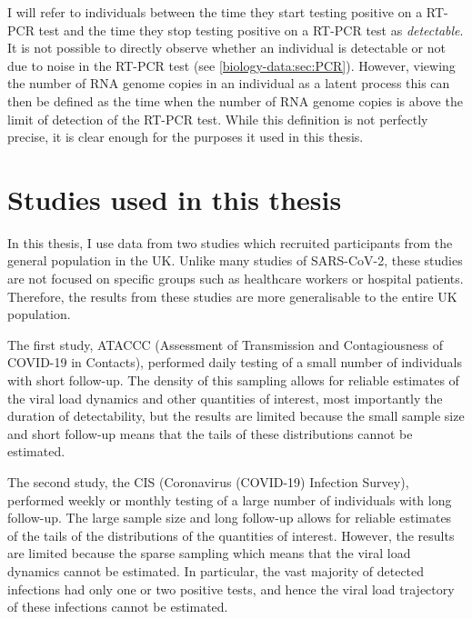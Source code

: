 \documentclass[thesis.tex]{subfiles}
\begin{document}
I will refer to individuals between the time they start testing positive on a RT-PCR test and the time they stop testing positive on a RT-PCR test as \emph{detectable}.
It is not possible to directly observe whether an individual is detectable or not due to noise in the RT-PCR test (see \cref{biology-data:sec:PCR}).
However, viewing the number of RNA genome copies in an individual as a latent process this can then be defined as the time when the number of RNA genome copies is above the limit of detection of the RT-PCR test.
While this definition is not perfectly precise, it is clear enough for the purposes it used in this thesis.



\section{Studies used in this thesis} \label{biology-data:sec:studies}

In this thesis, I use data from two studies which recruited participants from the general population in the UK.
Unlike many studies of SARS-CoV-2, these studies are not focused on specific groups such as healthcare workers or hospital patients.
Therefore, the results from these studies are more generalisable to the entire UK population.


The first study, ATACCC (Assessment of Transmission and Contagiousness of COVID-19 in Contacts), performed daily testing of a small number of individuals with short follow-up.
The density of this sampling allows for reliable estimates of the viral load dynamics and other quantities of interest, most importantly the duration of detectability, but the results are limited because the small sample size and short follow-up means that the tails of these distributions cannot be estimated.

The second study, the CIS (Coronavirus (COVID-19) Infection Survey), performed weekly or monthly testing of a large number of individuals with long follow-up.
The large sample size and long follow-up allows for reliable estimates of the tails of the distributions of the quantities of interest.
However, the results are limited because the sparse sampling which means that the viral load dynamics cannot be estimated.
In particular, the vast majority of detected infections had only one or two positive tests, and hence the viral load trajectory of these infections cannot be estimated.
\end{document}
